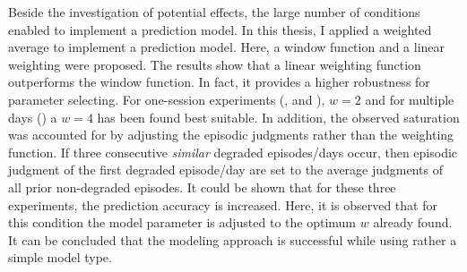 Beside the investigation of potential effects, the large number of conditions enabled to implement a prediction model.
In this thesis, I applied a weighted average to implement a prediction model.
Here, a window function and a linear weighting were proposed.
The results show that a linear weighting function outperforms the window function.
In fact, it provides a higher robustness for parameter selecting.
For one-session experiments (, and \EIIa{}), $\mathit{w}=2$ and for multiple days () a $\mathit{w}=4$ has been found best suitable.
In addition, the observed saturation was accounted for by adjusting the episodic judgments rather than the weighting function.
If three consecutive \emph{similar} degraded episodes/days occur, then episodic judgment of the first degraded episode/day are set to the average judgments of all prior non-degraded episodes.
It could be shown that for these three experiments, the prediction accuracy is increased.
Here, it is observed that for this condition the model parameter is adjusted to the optimum $\mathit{w}$ already found.
It can be concluded that the modeling approach is successful while using rather a simple model type.



